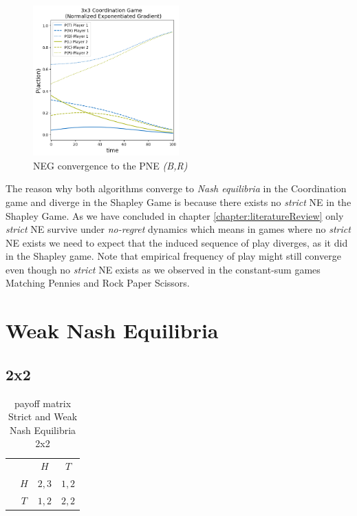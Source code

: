 \begin{figure}[H]
    \centering
    \includegraphics[width=0.5\textwidth]{logos/Coordination3x3-3.png}
    \caption{NEG convergence to the PNE \textit{(B,R)}}
    \label{fig:Coordination3x3-3}
\end{figure}

The reason why both algorithms converge to \textit{Nash equilibria} in the Coordination game and diverge in the Shapley Game is because there exists no \textit{strict} NE in the Shapley Game. As we have concluded in chapter \ref{chapter:literatureReview} only \textit{strict} NE survive under \textit{no-regret} dynamics which means in games where no \textit{strict} NE exists we need to expect that the induced sequence of play diverges, as it did in the Shapley game. Note that empirical frequency of play might still converge even though no \textit{strict} NE exists as we observed in the constant-sum games Matching Pennies and Rock Paper Scissors. 


\section{Weak Nash Equilibria}\label{section:WeakNashEquilibria}

\subsection{2x2}\label{subsection:2x2}

\begin{table}[H]\centering
\setlength{\extrarowheight}{2pt}
\begin{tabular}{cc|c|c|}
  & \multicolumn{1}{c}{} & \multicolumn{1}{c}{$H$}  & \multicolumn{1}{c}{$T$} \\\cline{3-4}
  & $H$ & $2,3$ & $1,2$ \\\cline{3-4}
  & $T$ & $1,2$ & $2,2$ \\\cline{3-4}
\end{tabular}\caption{\label{tab:payoffStrictAndWeak2x2}payoff matrix Strict and Weak Nash Equilibria 2x2}
\end{table}


